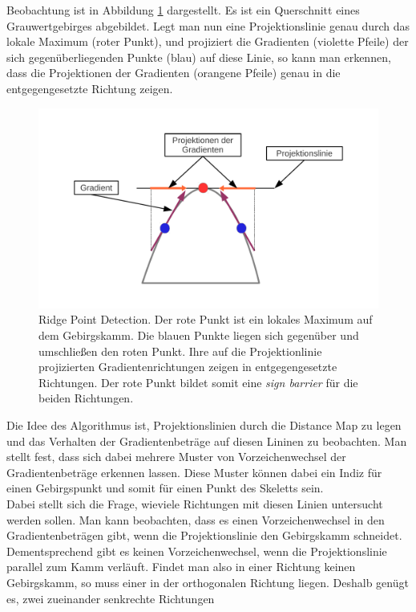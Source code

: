 Beobachtung ist in Abbildung \ref{fig:paper_ridge_point_detection} dargestellt. Es ist ein Querschnitt eines Grauwertgebirges
abgebildet. Legt man nun eine Projektionslinie genau durch das lokale Maximum (roter Punkt), und projiziert die Gradienten (violette Pfeile) der sich gegenüberliegenden Punkte (blau) auf diese Linie, so kann man erkennen, dass die Projektionen der Gradienten (orangene Pfeile) genau in die entgegengesetzte Richtung zeigen.\
\begin{figure}
\centering
\includegraphics[width=1.0\linewidth]{./fig/paper_ridge_point_detection.pdf}
\caption{Ridge Point Detection. Der rote Punkt ist ein lokales Maximum auf dem Gebirgskamm. Die blauen Punkte liegen sich
gegenüber und umschließen den roten Punkt. Ihre auf die Projektionlinie projizierten Gradientenrichtungen zeigen in entgegengesetzte Richtungen. Der rote Punkt bildet somit eine \emph{sign barrier} für die beiden Richtungen.}
\label{fig:paper_ridge_point_detection}
\end{figure}
Die Idee des Algorithmus ist, Projektionslinien durch die Distance Map zu legen und das Verhalten der Gradientenbeträge
auf diesen Lininen zu beobachten. Man stellt fest, dass sich dabei mehrere Muster von Vorzeichenwechsel der
Gradientenbeträge erkennen lassen. Diese Muster können dabei ein Indiz für einen Gebirgspunkt und somit für einen Punkt des Skeletts sein. \\
Dabei stellt sich die Frage, wieviele Richtungen mit diesen Linien untersucht werden sollen. Man kann beobachten, dass es
einen Vorzeichenwechsel in den Gradientenbeträgen gibt, wenn die Projektionslinie den Gebirgskamm schneidet. Dementsprechend 
gibt es keinen Vorzeichenwechsel, wenn die Projektionslinie parallel zum Kamm verläuft. Findet man also in einer Richtung
keinen Gebirgskamm, so muss einer in der orthogonalen Richtung liegen. Deshalb genügt es, zwei zueinander senkrechte Richtungen

